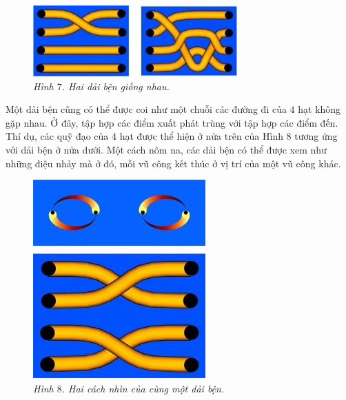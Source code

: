 \begin{multicols}{2}
\begin{figure}[H]
		\vspace*{-10pt}
	\end{figure}
	\begin{figure}[H]
		\vspace*{-10pt}
		\centering
		\captionsetup{labelformat= empty, justification=centering}
		\includegraphics[width= 0.97\linewidth]{fig_07}
		\caption{\small\textit{\color{duongvaotoanhoc}Hình $7$. Hai dải bện giống nhau.}}
		\vspace*{-10pt}
	\end{figure}
	Một dải bện cũng có thể được coi như một chuỗi các đường đi của $4$ hạt không gặp nhau. Ở đây, tập hợp các điểm xuất phát trùng với tập hợp các điểm đến. Thí dụ, các quỹ đạo của $4$ hạt được thể hiện ở nửa trên của Hình $8$ tương ứng với dải bện ở nửa dưới. Một cách nôm na, các dải bện có thể được xem như những điệu nhảy mà ở đó, mỗi vũ công kết thúc ở vị trí của một vũ công khác.
	\begin{figure}[H]
		\vspace*{-5pt}
		\centering
		\captionsetup{labelformat= empty, justification=centering}
		\includegraphics[width= 0.475\linewidth]{fig_08}
		\caption{\small\textit{\color{duongvaotoanhoc}Hình $8$. Hai cách nhìn của cùng một dải bện.}}
		\vspace*{-10pt}
	\end{figure}
	\begin{tBox}

\end{tBox}
\end{multicols}
